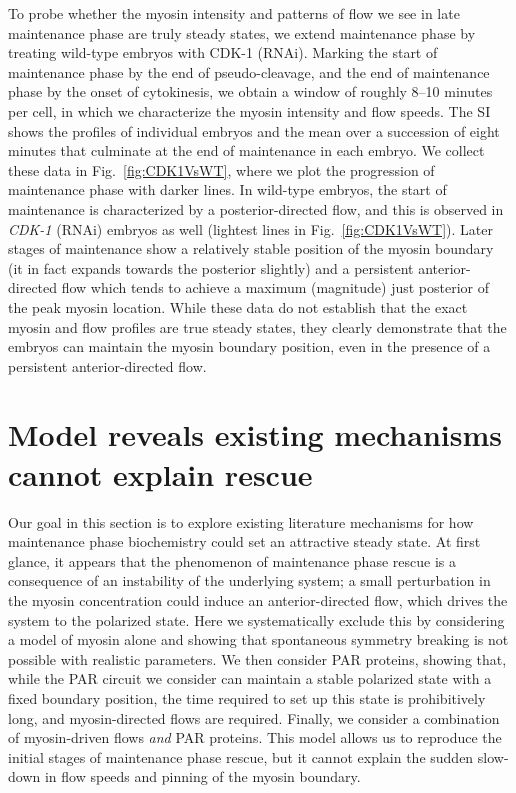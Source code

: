 \documentclass[11pt]{article}
\newcommand{\6}[1]{#1_{\text{6}}}
\newcommand{\3}[1]{#1_{\text{3}}}
\begin{document}
To probe whether the myosin intensity and patterns of flow we see in late maintenance phase are truly steady states, we extend maintenance phase by treating wild-type embryos with CDK-1 (RNAi). Marking the start of maintenance phase by the end of pseudo-cleavage, and the end of maintenance phase by the onset of cytokinesis, we obtain a window of roughly 8--10 minutes per cell, in which we characterize the myosin intensity and flow speeds. The SI shows the profiles of individual embryos and the mean over a succession of eight minutes that culminate at the end of maintenance in each embryo. We collect these data in Fig.\ \ref{fig:CDK1VsWT}, where we plot the progression of maintenance phase with darker lines. In wild-type embryos, the start of maintenance is characterized by a posterior-directed flow, and this is observed in \emph{CDK-1} (RNAi) embryos as well (lightest lines in Fig.\ \ref{fig:CDK1VsWT}). Later stages of maintenance show a relatively stable position of the myosin boundary (it in fact expands towards the posterior slightly) and a persistent anterior-directed flow which tends to achieve a maximum (magnitude) just posterior of the peak myosin location. While these data do not establish that the exact myosin and flow profiles are true steady states, they clearly demonstrate that the embryos can maintain the myosin boundary position, even in the presence of a persistent anterior-directed flow. 

\section{Model reveals existing mechanisms cannot explain rescue }
Our goal in this section is to explore existing literature mechanisms for how maintenance phase biochemistry could set an attractive steady state. At first glance, it appears that the phenomenon of maintenance phase rescue is a consequence of an instability of the underlying system; a small perturbation in the myosin concentration could induce an anterior-directed flow, which drives the system to the polarized state. Here we systematically exclude this by considering a model of myosin alone and showing that spontaneous symmetry breaking is not possible with realistic parameters. We then consider PAR proteins, showing that, while the PAR circuit we consider can maintain a stable polarized state with a fixed boundary position, the time required to set up this state is prohibitively long, and myosin-directed flows are required. Finally, we consider a combination of myosin-driven flows \emph{and} PAR proteins. This model allows us to reproduce the initial stages of maintenance phase rescue, but it cannot explain the sudden slow-down in flow speeds and pinning of the myosin boundary.
\end{document}
